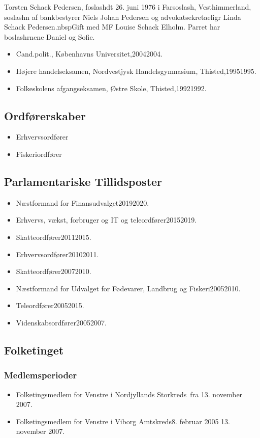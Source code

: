 \documentclass[11pt, a4paper]{awesome-cv}
\begin{document}
\makecvheader[R]
\makelettertitle
\begin{cvletter}
Torsten Schack  Pedersen, foslashdt 26. juni 1976 i Farsoslash, Vesthimmerland, soslashn af bankbestyrer Niels Johan Pedersen og advokatsekretaeligr Linda Schack Pedersen.nbspGift med MF Louise Schack Elholm. Parret har boslashrnene Daniel og Sofie.

\begin{itemize}
\item Cand.polit., Københavns Universitet,20042004.
\item Højere handelseksamen, Nordvestjysk Handelsgymnasium, Thisted,19951995.
\item Folkeskolens afgangseksamen, Østre Skole, Thisted,19921992.
\end{itemize}
\subsection*{Ordførerskaber}
\begin{itemize}
\item Erhvervsordfører
\item Fiskeriordfører
\end{itemize}
\subsection*{Parlamentariske Tillidsposter}
\begin{itemize}
\item Næstformand for Finansudvalget20192020.
\item Erhvervs, vækst, forbruger og IT og teleordfører20152019.
\item Skatteordfører20112015.
\item Erhvervsordfører20102011.
\item Skatteordfører20072010.
\item Næstformand for Udvalget for Fødevarer, Landbrug og Fiskeri20052010.
\item Teleordfører20052015.
\item Videnskabsordfører20052007.
\end{itemize}
\subsection*{Folketinget}
\subsubsection*{Medlemsperioder}
\begin{itemize}
\item Folketingsmedlem for Venstre i Nordjyllands Storkreds fra 13. november 2007.
\item Folketingsmedlem for Venstre i Viborg Amtskreds8. februar 2005  13. november 2007.
\end{itemize}

\end{cvletter}
\end{document}
